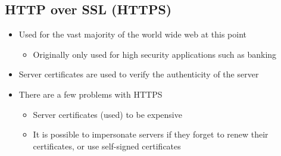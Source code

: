\subsection*{HTTP over SSL (HTTPS)}

\begin{itemize}
  \item Used for the vast majority of the world wide web at this point
  \begin{itemize}
    \item Originally only used for high security applications such as banking
  \end{itemize}
  \item Server certificates are used to verify the authenticity of the server
  \item There are a few problems with HTTPS
  \begin{itemize}
    \item Server certificates (used) to be expensive
    \item It is possible to impersonate servers if they forget to renew their certificates, or use self-signed certificates
  \end{itemize}
\end{itemize}